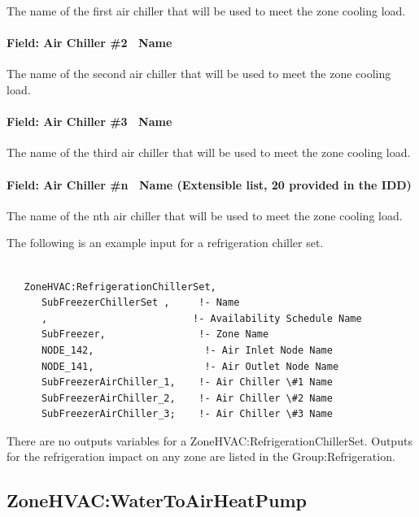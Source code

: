 The name of the first air chiller that will be used to meet the zone cooling load.

\paragraph{Field: Air Chiller \#2 ~Name}\label{field-air-chiller-2-name}

The name of the second air chiller that will be used to meet the zone cooling load.

\paragraph{Field: Air Chiller \#3 ~Name}\label{field-air-chiller-3-name}

The name of the third air chiller that will be used to meet the zone cooling load.

\paragraph{Field: Air Chiller \#n ~Name (Extensible list, 20 provided in the IDD)}\label{field-air-chiller-n-name-extensible-list-20-provided-in-the-idd}

The name of the nth air chiller that will be used to meet the zone cooling load.

The following is an example input for a refrigeration chiller set.

\begin{lstlisting}

   ZoneHVAC:RefrigerationChillerSet,
      SubFreezerChillerSet ,     !- Name
      ,                         !- Availability Schedule Name
      SubFreezer,                !- Zone Name
      NODE_142,                   !- Air Inlet Node Name
      NODE_141,                   !- Air Outlet Node Name
      SubFreezerAirChiller_1,    !- Air Chiller \#1 Name
      SubFreezerAirChiller_2,    !- Air Chiller \#2 Name
      SubFreezerAirChiller_3;    !- Air Chiller \#3 Name
\end{lstlisting}

There are no outputs variables for a ZoneHVAC:RefrigerationChillerSet. Outputs for the refrigeration impact on any zone are listed in the Group:Refrigeration.

\subsection{ZoneHVAC:WaterToAirHeatPump}\label{zonehvacwatertoairheatpump}


